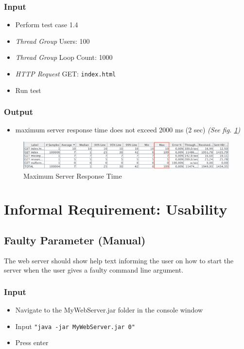 \documentclass[a4paper, 12pt]{article}
\begin{document}
\subsubsection{Input}
\begin{itemize}
\item Perform test case 1.4
\item \textit{Thread Group} Users: 100
\item \textit{Thread Group} Loop Count: 1000
\item \textit{HTTP Request} GET: \texttt{index.html}
\item Run test
\end{itemize}

\subsubsection{Output}
\begin{itemize}
\item maximum server response time does not exceed 2000 ms (2 sec) \textit{(See fig. \ref{TC4.1})}
\end{itemize}

\begin{figure}[H]
\includegraphics[scale=0.5]{output_clarification/HighLoad.png} 
\caption{Maximum Server Response Time}
\label{TC4.1}
\end{figure}

\section{Informal Requirement: Usability}

\subsection{Faulty Parameter (Manual)}

The web server should show help text informing the user on how to start the server when the user gives a faulty command line argument. 

\subsubsection{Input}
\begin{itemize}
\item Navigate to the MyWebServer.jar folder in the console window
\item Input \texttt{"java -jar MyWebServer.jar 0"}
\item Press enter
\end{itemize} 
\end{document}
